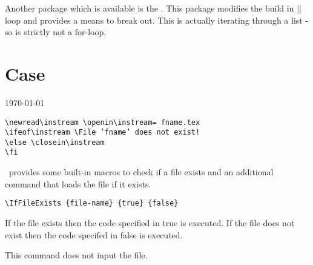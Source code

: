 \begin{teX}
\end{teX}

Another package which is available is the . This package modifies the \latex build in |\@for| loop and provides
a means to break out. This is actually iterating through a list - so is strictly not a for-loop.

\section*{Case}

\textsc{\today}

\renewcommand\today{\number\day \ 
  \ifcase\month\or
     January\or February\or March\or April\or May\or June\or
     July\or August\or September\or October\or November\or December
  \fi
  \number\year}

\begin{verbatim}
\newread\instream \openin\instream= fname.tex
\ifeof\instream \File ’fname’ does not exist!
\else \closein\instream 
\fi
\end{verbatim}

\latex\ provides some built-in macros to check if a file exists and an additional command that
loads the file if it exists.

\begin{verbatim}
\IfFileExists {file-name} {true} {false}
\end{verbatim}

If the file exists then the code specified in true is executed.
If the file does not exist then the code specifed in false is executed.

This command does not input the file.

